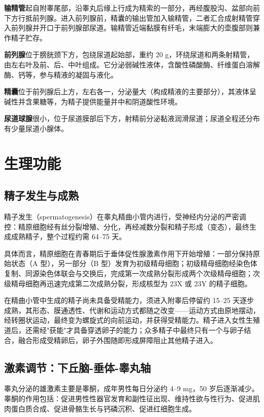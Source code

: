 \documentclass[12pt,UTF8,openany]{ctexbook}
\begin{document}
\textbf{输精管}起自附睾尾部，沿睾丸后缘上行成为精索的一部分，再经腹股沟、盆部向前下方行抵前列腺。进入前列腺前，精囊的输出管加入输精管，二者汇合成射精管穿入前列腺并开口于前列腺部尿道。输精管近端黏膜有纤毛，末端膨大的壶腹部则兼作精子贮存。

\textbf{前列腺}位于膀胱颈下方，包绕尿道起始部，重约 20 g，环绕尿道和两条射精管，由左右叶及前、后、中叶组成。它分泌弱碱性液体，含酸性磷酸酶、纤维蛋白溶解酶、钙等，参与精液的凝固与液化。

\textbf{精囊}位于前列腺后上方，左右各一，分泌量大（构成精液的主要部分），其液体呈碱性并含果糖等，为精子提供能量并中和阴道酸性环境。

\textbf{尿道球腺}很小，位于尿道膜部后下方，射精前分泌黏液润滑尿道；尿道全程还分布有少量尿道小腺体。

\section{生理功能}

\subsection*{精子发生与成熟}

精子发生（spermatogenesis）在睾丸精曲小管内进行，受神经内分泌的严密调控：精原细胞经有丝分裂增殖、分化，再经减数分裂和精子形成（变态），最终生成成熟精子，整个过程约需 64--75 天。

具体而言，精原细胞在青春期后于垂体促性腺激素作用下开始增殖：一部分保持原始状态（A 型），另一部分（B 型）发育为初级精母细胞；初级精母细胞经染色体复制、同源染色体联会与交换后，完成第一次成熟分裂形成两个次级精母细胞；次级精母细胞再迅速完成第二次成熟分裂，形成核型为 23X 或 23Y 的精子细胞。

在精曲小管中生成的精子尚未具备受精能力，须进入附睾后停留约 15--25 天逐步成熟，其形态、膜通透性、代谢和运动方式都随之改变——运动方式由原地摆动，经转圈状运动，最终变为螺旋式的向前运动，并获得受精能力。精子进入女性生殖道后，还需经"获能"才具备穿透卵子的能力；众多精子中最终只有一个与卵子结合，融合形成受精卵后，卵子外围随即形成屏障阻止其他精子进入。

\subsection*{激素调节：下丘脑-垂体-睾丸轴}

睾丸分泌的雄激素主要是睾酮，成年男性每日分泌约 4--9 mg，50 岁后逐渐减少。睾酮的作用包括：促进男性性器官发育和副性征出现、维持性欲与性行为、促进肌肉蛋白质合成、促进骨骼生长与钙磷沉积、促进红细胞生成。
\end{document}
